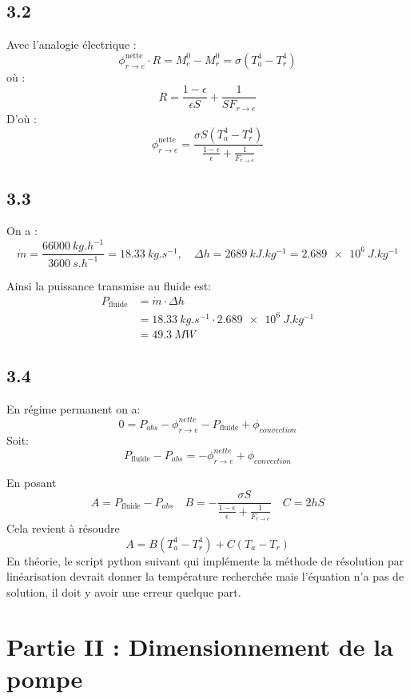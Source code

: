 \documentclass[12pt]{article}
\begin{document}
\subsection*{3.2}
Avec l'analogie électrique :
\[
\phi^{\text{nette}}_{r \rightarrow e} \cdot R = M^0_e - M^0_r = \sigma \left(T_a^4 - T_r^4\right)
\]
où :
\[
R = \frac{1 - \epsilon}{\epsilon S} + \frac{1}{S F_{r \rightarrow e}}
\]
D'où :
\[
\phi^{\text{nette}}_{r \rightarrow e} = \frac{\sigma S (T_a^4 - T_r^4)}{\frac{1 - \epsilon}{\epsilon} + \frac{1}{F_{r \rightarrow e}}}
\]

\subsection*{3.3}
On a :
\[
\dot{m} = \frac{\SI{66000}{kg.h^{-1}}}{\SI{3600}{s.h^{-1}}} = \SI{18.33}{kg.s^{-1}}, \quad
\Delta h = \SI{2689}{kJ.kg^{-1}} = \SI{2.689e6}{J.kg^{-1}}
\]

Ainsi la puissance transmise au fluide est:
\begin{align*}
P_{\text{fluide}} &= \dot{m} \cdot \Delta h \\ &= \SI{18.33}{kg.s^{-1}} \cdot \SI{2.689e6}{J.kg^{-1}} \\ &= \boxed{\SI{49.3}{MW}}
\end{align*}

\subsection*{3.4}
En régime permanent on a:
\[
0 = P_{abs} - \phi^{nette}_{r \rightarrow e} - P_{\text{fluide}} + \phi_{convection}
\]
Soit:
\[
P_{\text{fluide}} - P_{abs}  = -\phi^{nette}_{r \rightarrow e} + \phi_{convection}
\]

En posant
\[
A = P_{\text{fluide}} - P_{abs} \quad B = -\frac{\sigma S}{\frac{1-\epsilon}{\epsilon} + \frac{1}{F_{r \rightarrow e}}} \quad C = 2hS
\]
Cela revient à résoudre
\[
A = B(T_a^4 - T_r^4) + C(T_a - T_r)
\]
En théorie, le script python suivant qui implémente la méthode de résolution par linéarisation devrait donner la température recherchée mais l'équation n'a pas de solution, il doit y avoir une erreur quelque part.




\section*{Partie II : Dimensionnement de la pompe}
\end{document}
